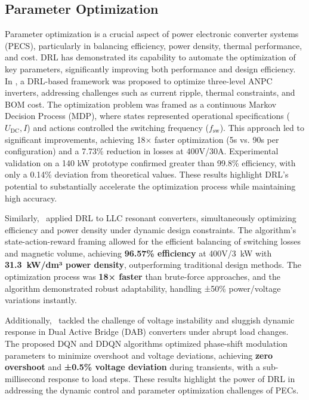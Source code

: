 \subsection{Parameter Optimization}
\label{sec:param_opt}

Parameter optimization is a crucial aspect of power electronic converter systems (PECS), particularly in balancing efficiency, power density, thermal performance, and cost. DRL has demonstrated its capability to automate the optimization of key parameters, significantly improving both performance and design efficiency.
In \cite{wang2024case, wang2022efficiency}, a DRL-based framework was proposed to optimize three-level ANPC inverters, addressing challenges such as current ripple, thermal constraints, and BOM cost. The optimization problem was framed as a continuous Markov Decision Process (MDP), where states represented operational specifications (\(U_{\text{DC}}, I\)) and actions controlled the switching frequency (\(f_{\text{sw}}\)). This approach led to significant improvements, achieving 18× faster optimization (5s vs. 90s per configuration) and a 7.73\% reduction in losses at 400V/30A. Experimental validation on a 140 kW prototype confirmed greater than 99.8\% efficiency, with only a 0.14\% deviation from theoretical values. These results highlight DRL's potential to substantially accelerate the optimization process while maintaining high accuracy.

Similarly,~\cite{wang2023efficiency} applied DRL to LLC resonant converters, simultaneously optimizing efficiency and power density under dynamic design constraints. The algorithm's state-action-reward framing allowed for the efficient balancing of switching losses and magnetic volume, achieving \textbf{96.57\% efficiency} at 400V/3~kW with \textbf{31.3~kW/dm³ power density}, outperforming traditional design methods. The optimization process was \textbf{18× faster} than brute-force approaches, and the algorithm demonstrated robust adaptability, handling ±50\% power/voltage variations instantly.

Additionally,~\cite{zhang2024reinforcement} tackled the challenge of voltage instability and sluggish dynamic response in Dual Active Bridge (DAB) converters under abrupt load changes. The proposed DQN and DDQN algorithms optimized phase-shift modulation parameters to minimize overshoot and voltage deviations, achieving \textbf{zero overshoot} and \textbf{±0.5\% voltage deviation} during transients, with a sub-millisecond response to load steps. These results highlight the power of DRL in addressing the dynamic control and parameter optimization challenges of PECs.

